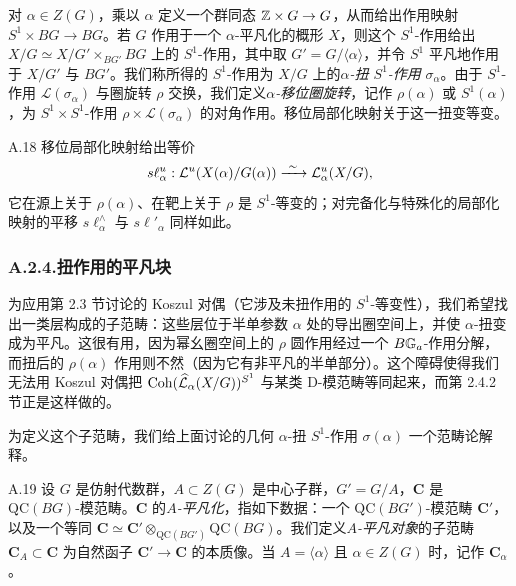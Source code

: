 对 $\alpha\in Z(G)$，乘以 $\alpha$ 定义一个群同态 $\mathbb{Z}\times G\to G$，从而给出作用映射 $S^1\times BG\to BG$。若 $G$ 作用于一个 $\alpha$-平凡化的概形 $X$，则这个 $S^1$-作用给出 $X/G\simeq X/G'\times_{BG'}BG$ 上的 $S^1$-作用，其中取 $G'=G/\langle\alpha\rangle$，并令 $S^1$ 平凡地作用于 $X/G'$ 与 $BG'$。我们称所得的 $S^1$-作用为 $X/G$ 上的\emph{$\alpha$-扭 $S^1$-作用} $\sigma_\alpha$。由于 $S^1$-作用 $\mathcal L(\sigma_\alpha)$ 与圈旋转 $\rho$ 交换，我们定义\emph{$\alpha$-移位圈旋转}，记作 $\rho(\alpha)$ 或 $S^1(\alpha)$，为 $S^1\times S^1$-作用 $\rho\times\mathcal L(\sigma_\alpha)$ 的对角作用。移位局部化映射关于这一扭变等变。

\begin{cor}{A.18}\label{cor:a5-04-12}
移位局部化映射给出等价
\[
s\ell^u_\alpha:\mathcal L^u(X(\alpha)/G(\alpha))\xrightarrow{\ \sim\ }\mathcal L^u_\alpha(X/G),
\]
它在源上关于 $\rho(\alpha)$、在靶上关于 $\rho$ 是 $S^1$-等变的；对完备化与特殊化的局部化映射的平移 $s\ell^{\wedge}_\alpha$ 与 $s\ell'_\alpha$ 同样如此。
\end{cor}


\subsubsection*{A.2.4.\quad 扭作用的平凡块}

为应用第 2.3 节讨论的 Koszul 对偶（它涉及未扭作用的 $S^1$-等变性），我们希望找出一类层构成的子范畴：这些层位于半单参数 $\alpha$ 处的导出圈空间上，并使 $\alpha$-扭变成为平凡。这很有用，因为幂幺圈空间上的 $\rho$ 圆作用经过一个 $B\mathbb{G}_a$-作用分解，而扭后的 $\rho(\alpha)$ 作用则不然（因为它有非平凡的半单部分）。这个障碍使得我们无法用 Koszul 对偶把 $\operatorname{Coh}(\widehat{\mathcal L}_\alpha(X/G))^{S^1}$ 与某类 D-模范畴等同起来，而第 2.4.2 节正是这样做的。

为定义这个子范畴，我们给上面讨论的几何 $\alpha$-扭 $S^1$-作用 $\sigma(\alpha)$ 一个范畴论解释。

\begin{defn}{A.19}\label{defn:a5-04-13}
设 $G$ 是仿射代数群，$A\subset Z(G)$ 是中心子群，$G'=G/A$，$\mathbf C$ 是 $\mathrm{QC}(BG)$-模范畴。$\mathbf C$ 的\emph{$A$-平凡化}，指如下数据：一个 $\mathrm{QC}(BG')$-模范畴 $\mathbf C'$，以及一个等同 $\mathbf C\simeq\mathbf C'\otimes_{\mathrm{QC}(BG')}\mathrm{QC}(BG)$。我们定义\emph{$A$-平凡对象}的子范畴 $\mathbf C_A\subset\mathbf C$ 为自然函子 $\mathbf C'\to\mathbf C$ 的本质像。当 $A=\langle\alpha\rangle$ 且 $\alpha\in Z(G)$ 时，记作 $\mathbf C_\alpha$。
\end{defn}

